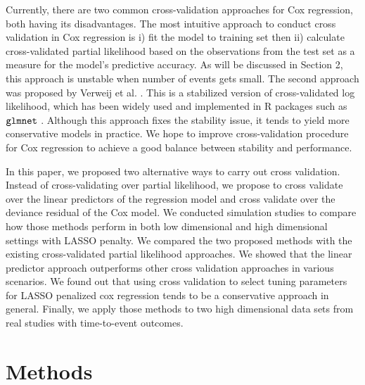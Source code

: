 
\par Currently, there are two common cross-validation approaches for Cox regression, both having its disadvantages. The most intuitive approach to conduct cross validation in Cox regression is i) fit the model to training set then ii) calculate cross-validated partial likelihood based on the observations from the test set as a measure for the model's predictive accuracy. As will be discussed in Section 2, this approach is unstable when number of events gets small. The second approach was proposed by Verweij et al. \citep{Verweij1993}. This is a stabilized version of cross-validated log likelihood, which has been widely used and implemented in R packages such as $\tt{glmnet}$ \citep{glmnet}. Although this approach fixes the stability issue, it tends to yield more conservative models in practice. We hope to improve cross-validation procedure for Cox regression to achieve a good balance between stability and performance.

\par In this paper, we proposed two alternative ways to carry out cross validation. Instead of cross-validating over partial likelihood, we propose to cross validate over the linear predictors of the regression model and cross validate over the deviance residual \citep{Therneau1990}of the Cox model. We conducted simulation studies to compare how those methods perform in both low dimensional and high dimensional settings with LASSO penalty. We compared the two proposed methods with the existing cross-validated partial likelihood approaches. We showed that the linear predictor approach outperforms other cross validation approaches in various scenarios. We found out that using cross validation to select tuning parameters for LASSO penalized cox regression tends to be a conservative approach in general. Finally, we apply those methods to two high dimensional data sets from real studies with time-to-event outcomes.

\section{Methods}

